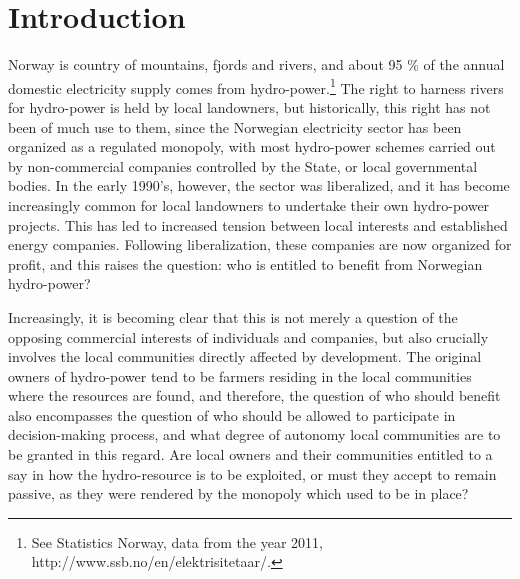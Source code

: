 \section{Introduction}\label{intro}

Norway is country of mountains, fjords and rivers, and about 95 \% of the annual domestic electricity supply comes from hydro-power.\footnote{See Statistics Norway, data from the year 2011, http://www.ssb.no/en/elektrisitetaar/.} The right to harness rivers for hydro-power is held by local landowners, but historically, this right has not been of much use to them, since the Norwegian electricity sector has been organized as a regulated monopoly, with most hydro-power schemes carried out by non-commercial companies controlled by the State, or local governmental bodies. In the early 1990's, however, the sector was liberalized, and it has become increasingly common for local landowners to undertake their own hydro-power projects. This has led to increased tension between local interests and established energy companies. Following liberalization, these companies are now organized for profit, and this raises the question: who is entitled to benefit from Norwegian hydro-power? 

Increasingly, it is becoming clear that this is not merely a question of the opposing commercial interests of individuals and companies, but also crucially involves the local communities directly affected by development. The original owners of hydro-power tend to be farmers residing in the local communities where the resources are found, and therefore, the question of who should benefit also encompasses the question of who should be allowed to participate in decision-making process, and what degree of autonomy local communities are to be granted in this regard. Are local owners and their communities entitled to a say in how the hydro-resource is to be exploited, or must they accept to remain passive, as they were rendered by the monopoly which used to be in place?

